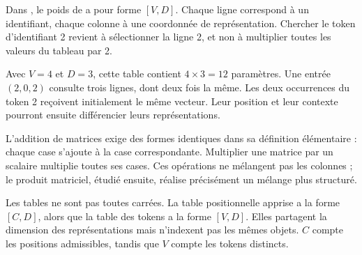 Dans , le poids de  a pour
forme \([V,D]\). Chaque ligne correspond à un identifiant, chaque
colonne à une coordonnée de représentation. Chercher le token
d'identifiant 2 revient à sélectionner la ligne 2, et non à
multiplier toutes les valeurs du tableau par 2.

Avec \(V=4\) et \(D=3\), cette table contient \(4\times3=12\)
paramètres. Une entrée \((2,0,2)\) consulte trois lignes, dont
deux fois la même. Les deux occurrences du token 2 reçoivent
initialement le même vecteur. Leur position et leur contexte
pourront ensuite différencier leurs représentations.

L'addition de matrices exige des formes identiques dans sa définition
élémentaire : chaque case s'ajoute à la case correspondante.
Multiplier une matrice par un scalaire multiplie toutes ses cases.
Ces opérations ne mélangent pas les colonnes ; le produit matriciel,
étudié ensuite, réalise précisément un mélange plus structuré.

Les tables ne sont pas toutes carrées. La table positionnelle apprise
a la forme \([C,D]\), alors que la table des tokens a la forme
\([V,D]\). Elles partagent la dimension des représentations mais
n'indexent pas les mêmes objets. \(C\) compte les positions
admissibles, tandis que \(V\) compte les tokens distincts.



